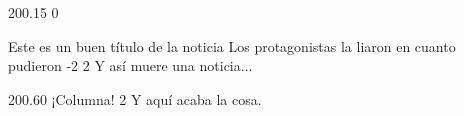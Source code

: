 
\begin{cajacol1}{2}{0}{0.15}
	{}
	{}
	{0} %
\end{cajacol1}

\begin{noticiacolmulti}{4}{2}{0.20}
	{Este es un buen título de la noticia}
	{Los protagonistas la liaron en cuanto pudieron}
	{-2}	%
	{2}		%
	{}	%
	\lipsum[1-2]
	\lipsum[2]
	Y así muere una noticia...
%	
\end{noticiacolmulti}

\begin{noticiacol1}{2}{0}{0.60}
	{¡Columna!}
	{}
	{2} %
	\noindent\small\lipsum[2-3]\lipsum[2]
	Y aquí acaba la cosa.
%	
\end{noticiacol1}

